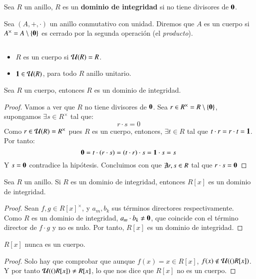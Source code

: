 \begin{dfn}
    Sea $R$ un anillo, $R$ es un \textbf{dominio de integridad} si no tiene divisores de $\mathbf{0}$.
\end{dfn}

\begin{dfn}[Cuerpo]
    Sea $(A, +, \cdot)$ un anillo conmutativo con unidad. Diremos que $A$ es un cuerpo si $A^{\times} = A\setminus \{\mathbf{0}\}$ es cerrado por la segunda operación (el \textit{producto}).
\end{dfn}

\begin{obs} $ $
    \begin{itemize}
        \item $R$ es un cuerpo si $\mathcal{U}(R) = R$.
        \item $\mathbf{1} \in \mathcal{U}(R)$, para todo $R$ anillo unitario.
    \end{itemize}
\end{obs}

\begin{pro}\label{pro:cuerpoDI}
    Sea $R$ un cuerpo, entonces $R$ es un dominio de integridad.
\end{pro}
\begin{proof}
    Vamos a ver que $R$ no tiene divisores de $\mathbf{0}$. Sea $r \in R^{\times} = R\setminus \{\mathbf{0}\}$, supongamos $\exists s \in R^{\times}$ tal que:
    $$
        r \cdot s = 0
    $$
    Como $r \in \mathcal{U}(R) = R^{\times}$ pues $R$ es un cuerpo, entonces, $\exists t \in R$ tal que $t\cdot r = r\cdot t = \mathbf{1}$. Por tanto:
    $$
        \mathbf{0} = t \cdot (r \cdot s) = (t \cdot r) \cdot s = \mathbf{1} \cdot s = s
    $$
    Y $s = \mathbf{0}$ contradice la hipótesis. Concluimos con que $\not \exists r, s \in R$ tal que $r \cdot s = \mathbf{0}$
\end{proof}

\begin{pro}
    Sea $R$ un anillo. Si $R$ es un dominio de integridad, entonces $R[x]$ es un dominio de integridad.
\end{pro}
\begin{proof}
    Sean $f, g \in R[x]^{\times}$, y $a_m, b_k$ sus términos directores respectivamente. Como $R$ es un dominio de integridad, $a_m \cdot b_k \neq \mathbf{0}$, que coincide con el término director de $f \cdot g$ y no es nulo. Por tanto, $R[x]$ es un dominio de integridad.
\end{proof}

\begin{pro}
    $R[x]$ nunca es un cuerpo.
\end{pro}
\begin{proof}
    Solo hay que comprobar que aunque $f(x) = x \in R[x]$, $f(x) \notin \mathcal{U}(()R[x])$. Y por tanto $\mathcal{U}(()R[x]) \neq R[x]$, lo que nos dice que $R[x]$ no es un cuerpo.
\end{proof}

